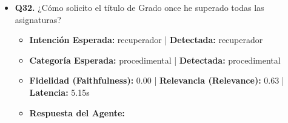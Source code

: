 \documentclass[12pt,a4paper,oneside]{report}
\begin{document}
\begin{itemize}
\begin{itemize}
\begin{quote}
\noindent\textbf{Plataformas y Documentos Relevantes}\\

\begin{itemize}
  \item \textbf{SEVIUS}: No se utiliza directamente en este proceso, pero puede ser útil para consultar información académica.
  \item \textbf{Secretaría Virtual}: Puede ser utilizada para presentar el recurso de apelación de forma telemática, si está disponible.
  \item \textbf{Impreso de Recurso de Apelación}: No se especifica un impreso concreto, pero el estudiante debe presentar un escrito formalizando su recurso de apelación.
\end{itemize}
                \end{quote}
          \item \textbf{{Ground Truth (Referencia):}} \\
                \begin{quote}
El alumno puede presentar una solicitud de reclamación ante el Departamento responsable de la asignatura en el plazo de reclamaciones oficial tras la publicación de actas provisionales.
                \end{quote}
          \item \textbf{{Referencias / Fuentes Utilizadas:}} \\
                \begin{itemize}
                  \item NORMATIVA REGUL.pdf (Página 11)
                  \item R.R. NORMAS DE MATRICULA GRADO Y MASTER UNIVERSITARIO 2025-2026.pdf (Página 17)
                  \item NORMATIVA REGUL.pdf (Página 2)
                  \item NORMATIVA REGUL.pdf (Página 1)
                \end{itemize}
        \end{itemize}

  
\item \textbf{Q32.} ¿Cómo solicito el título de Grado once he superado todas las asignaturas? \\
        \begin{itemize}
          \item \textbf{Intención Esperada:} recuperador | \textbf{Detectada:} recuperador
          \item \textbf{Categoría Esperada:} procedimental | \textbf{Detectada:} procedimental
          \item \textbf{Fidelidad (Faithfulness):} 0.00 | \textbf{Relevancia (Relevance):} 0.63 | \textbf{Latencia:} 5.15s
          \item \textbf{{Respuesta del Agente:}} \\
                \begin{quote}


\end{quote}
\end{itemize}
\end{itemize}
\end{document}
